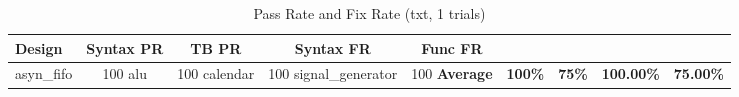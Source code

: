 \begin{table}[h]
\centering
\caption{Pass Rate and Fix Rate (txt, 1 trials)}
\begin{tabular}{l|cc|cc}
  \hline
  Design & Syntax PR & TB PR & Syntax FR & Func FR \\
  \hline
  asyn_fifo & 100%
  alu & 100%
  calendar & 100%
  signal_generator & 100%
  \hline
  \textbf{Average} & \textbf{100\%} & \textbf{75\%} & \textbf{100.00\%} & \textbf{75.00\%} \\
  \hline
\end{tabular}
\end{table}